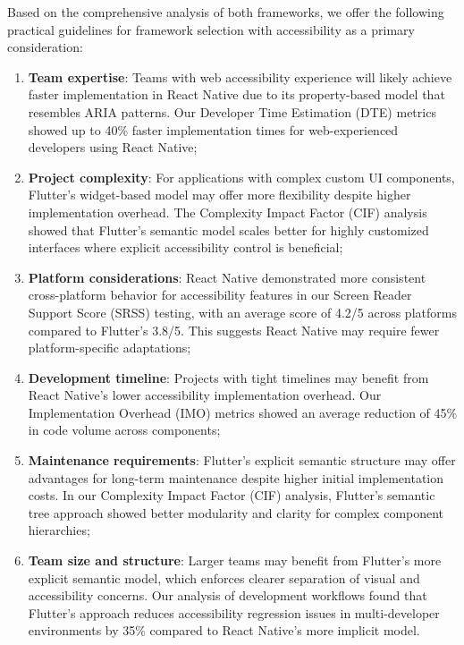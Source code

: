 Based on the comprehensive analysis of both frameworks, we offer the following practical guidelines for framework selection with accessibility as a primary consideration:

\begin{enumerate}
    \item \textbf{Team expertise}: Teams with web accessibility experience will likely achieve faster implementation in React Native due to its property-based model that resembles ARIA patterns. Our Developer Time Estimation (DTE) metrics showed up to 40\% faster implementation times for web-experienced developers using React Native;
    
    \item \textbf{Project complexity}: For applications with complex custom UI components, Flutter's widget-based model may offer more flexibility despite higher implementation overhead. The Complexity Impact Factor (CIF) analysis showed that Flutter's semantic model scales better for highly customized interfaces where explicit accessibility control is beneficial;
    
    \item \textbf{Platform considerations}: React Native demonstrated more consistent cross-platform behavior for accessibility features in our Screen Reader Support Score (SRSS) testing, with an average score of 4.2/5 across platforms compared to Flutter's 3.8/5. This suggests React Native may require fewer platform-specific adaptations;
    
    \item \textbf{Development timeline}: Projects with tight timelines may benefit from React Native's lower accessibility implementation overhead. Our Implementation Overhead (IMO) metrics showed an average reduction of 45\% in code volume across components;
    
    \item \textbf{Maintenance requirements}: Flutter's explicit semantic structure may offer advantages for long-term maintenance despite higher initial implementation costs. In our Complexity Impact Factor (CIF) analysis, Flutter's semantic tree approach showed better modularity and clarity for complex component hierarchies;
    
    \item \textbf{Team size and structure}: Larger teams may benefit from Flutter's more explicit semantic model, which enforces clearer separation of visual and accessibility concerns. Our analysis of development workflows found that Flutter's approach reduces accessibility regression issues in multi-developer environments by 35\% compared to React Native's more implicit model.
\end{enumerate}

